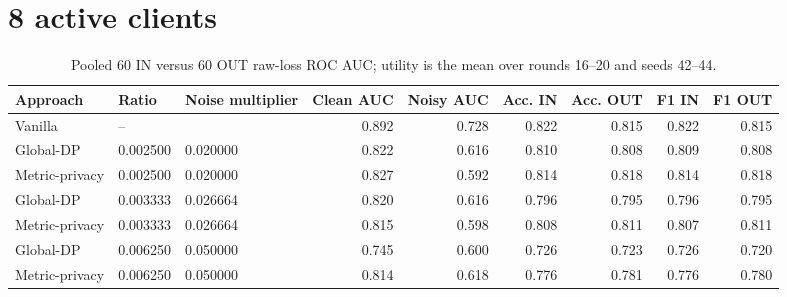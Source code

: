 \documentclass[10pt,a4paper,landscape]{article}
\begin{document}
\section*{8 active clients}
\begin{table}[h]
\centering
\caption{Pooled 60 IN versus 60 OUT raw-loss ROC AUC; utility is the mean over rounds 16--20 and seeds 42--44.}
\begin{tabular}{lllrrrrrr}
\toprule
Approach & Ratio & Noise multiplier & Clean AUC & Noisy AUC & Acc. IN & Acc. OUT & F1 IN & F1 OUT \\
\midrule
Vanilla & -- &  & 0.892 & 0.728 & 0.822 & 0.815 & 0.822 & 0.815 \\
Global-DP & 0.002500 & 0.020000 & 0.822 & 0.616 & 0.810 & 0.808 & 0.809 & 0.808 \\
Metric-privacy & 0.002500 & 0.020000 & 0.827 & 0.592 & 0.814 & 0.818 & 0.814 & 0.818 \\
Global-DP & 0.003333 & 0.026664 & 0.820 & 0.616 & 0.796 & 0.795 & 0.796 & 0.795 \\
Metric-privacy & 0.003333 & 0.026664 & 0.815 & 0.598 & 0.808 & 0.811 & 0.807 & 0.811 \\
Global-DP & 0.006250 & 0.050000 & 0.745 & 0.600 & 0.726 & 0.723 & 0.726 & 0.720 \\
Metric-privacy & 0.006250 & 0.050000 & 0.814 & 0.618 & 0.776 & 0.781 & 0.776 & 0.780 \\
\bottomrule
\end{tabular}
\end{table}
\clearpage
\end{document}
